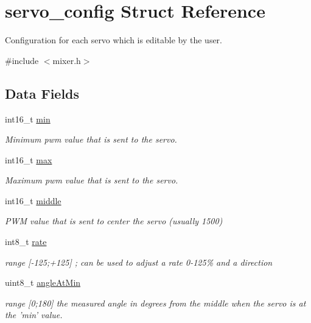 \hypertarget{structservo__config}{\section{servo\+\_\+config Struct Reference}
\label{structservo__config}
}


Configuration for each servo which is editable by the user.  




{\ttfamily \#include $<$mixer.\+h$>$}

\subsection*{Data Fields}
\begin{DoxyCompactItemize}
\item 
int16\+\_\+t \hyperlink{structservo__config_a8b1c26f5402d045623107565facdc34b}{min}
\begin{DoxyCompactList}\small\item\em Minimum pwm value that is sent to the servo. \end{DoxyCompactList}\item 
int16\+\_\+t \hyperlink{structservo__config_a838c63fb621bfa9bec579d52d1a81177}{max}
\begin{DoxyCompactList}\small\item\em Maximum pwm value that is sent to the servo. \end{DoxyCompactList}\item 
int16\+\_\+t \hyperlink{structservo__config_a8ba992e9b21b0e0c308fcc554709f690}{middle}
\begin{DoxyCompactList}\small\item\em P\+W\+M value that is sent to center the servo (usually 1500) \end{DoxyCompactList}\item 
int8\+\_\+t \hyperlink{structservo__config_a418cf99c621aae96fbb8cde4ad27e596}{rate}
\begin{DoxyCompactList}\small\item\em range \mbox{[}-\/125;+125\mbox{]} ; can be used to adjust a rate 0-\/125\% and a direction \end{DoxyCompactList}\item 
uint8\+\_\+t \hyperlink{structservo__config_a1db90f6f1f2152b1925f721b5bd8106a}{angle\+At\+Min}
\begin{DoxyCompactList}\small\item\em range \mbox{[}0;180\mbox{]} the measured angle in degrees from the middle when the servo is at the 'min' value. \end{DoxyCompactList}\item 

\end{DoxyCompactItemize}
